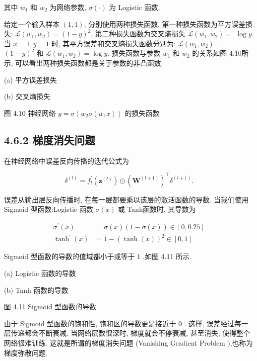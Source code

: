 \documentclass[10pt]{article}
\begin{document}
其中 $w_{1}$ 和 $w_{2}$ 为网络参数, $\sigma(\cdot)$ 为 Logistic 函数.

给定一个输入样本 $(1,1)$, 分别使用两种损失函数, 第一种损失函数为平方误差损失: $\mathcal{L}\left(w_{1}, w_{2}\right)=(1-y)^{2}$, 第二种损失函数为交叉熵损失 $\mathcal{L}\left(w_{1}, w_{2}\right)=$ $\log y$. 当 $x=1, y=1$ 时, 其平方误差和交叉熵损失函数分别为: $\mathcal{L}\left(w_{1}, w_{2}\right)=$ $(1-y)^{2}$ 和 $\mathcal{L}\left(w_{1}, w_{2}\right)=\log y$. 损失函数与参数 $w_{1}$ 和 $w_{2}$ 的关系如图 4.10所示, 可以看出两种损失函数都是关于参数的非凸函数.



(a) 平方误差损失



(b) 交叉熵损失

图 4.10 神经网络 $y=\sigma\left(w_{2} \sigma\left(w_{1} x\right)\right)$ 的损失函数

\subsection*{4.6.2 梯度消失问题}
在神经网络中误差反向传播的迭代公式为


\begin{equation*}
\delta^{(l)}=f_{l}^{\prime}\left(\boldsymbol{z}^{(l)}\right) \odot\left(\boldsymbol{W}^{(l+1)}\right)^{\top} \delta^{(l+1)} . \tag{4.91}
\end{equation*}


误差从输出层反向传播时, 在每一层都要乘以该层的激活函数的导数. 当我们使用 Sigmoid 型函数:Logistic 函数 $\sigma(x)$ 或 Tanh函数时, 其导数为


\begin{align*}
\sigma^{\prime}(x) & =\sigma(x)(1-\sigma(x)) \in[0,0.25]  \tag{4.92}\\
\tanh ^{\prime}(x) & =1-(\tanh (x))^{2} \in[0,1] \tag{4.93}
\end{align*}


Sigmoid 型函数的导数的值域都小于或等于 1 ,如图 4.11 所示.



(a) Logistic 函数的导数



(b) Tanh 函数的导数

图 4.11 Sigmoid 型函数的导数

由于 Sigmoid 型函数的饱和性, 饱和区的导数更是接近于 0 . 这样, 误差经过每一层传递都会不断衰减. 当网络层数很深时, 梯度就会不停衰减, 甚至消失, 使得整个网络很难训练. 这就是所谓的梯度消失问题 (Vanishing Gradient Problem ),也称为梯度弥散问题.
\end{document}
